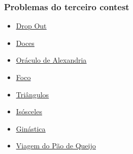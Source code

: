 \documentclass{beamer}
\begin{document}
	\begin{frame}
	\frametitle{Problemas do terceiro contest}
	\begin{itemize}
	\item \textcolor{blue}{\underline{\href{https://www.urionlinejudge.com.br/judge/pt/problems/view/1327}{Drop Out}}}
	\item \textcolor{blue}{\underline{\href{https://www.urionlinejudge.com.br/judge/pt/problems/view/1372}{Doces}}}
	\item \textcolor{blue}{\underline{\href{https://www.urionlinejudge.com.br/judge/pt/problems/view/1457}{Oráculo de Alexandria}}}
	\item \textcolor{blue}{\underline{\href{https://www.urionlinejudge.com.br/judge/pt/problems/view/1459}{Foco}}}
	\item \textcolor{blue}{\underline{\href{https://www.urionlinejudge.com.br/judge/pt/problems/view/1472}{Triângulos}}}
	\item \textcolor{blue}{\underline{\href{https://www.urionlinejudge.com.br/judge/pt/problems/view/2243}{Isósceles}}}
	\item \textcolor{blue}{\underline{\href{https://www.urionlinejudge.com.br/judge/pt/problems/view/2664}{Ginástica}}}
	\item \textcolor{blue}{\underline{\href{https://www.urionlinejudge.com.br/judge/pt/problems/view/2856}{Viagem do Pão de Queijo}}}
	\end{itemize}
	\end{frame}
\end{document}
